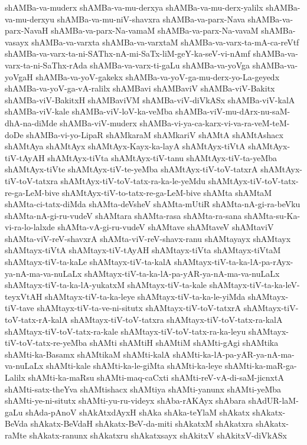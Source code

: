 {shAMBa-va-muderx
shAMBa-va-mu-derxya
shAMBa-va-mu-derx-yalilx
shAMBa-va-mu-derxyu
shAMBa-va-mu-niV-shavxra
shAMBa-va-parx-Nava
shAMBa-va-parx-NavaH
shAMBa-va-parx-Na-vamaM
shAMBa-va-parx-Na-vavaM
shAMBa-vasayx
shAMBa-va-varxta
shAMBa-va-varxtaM
shAMBa-va-varx-ta-mA-ca-reVtf
shAMBa-va-varx-ta-ni-SAThx-nA-mi-SaTx-liM-geY-ka-seV-vi-nAmf
shAMBa-va-varx-ta-ni-SaThx-rAda
shAMBa-va-varx-ti-gaLu
shAMBa-va-yoVga
shAMBa-va-yoVgaH
shAMBa-va-yoV-gakekx
shAMBa-va-yoV-ga-mu-derx-yo-La-geyedx
shAMBa-va-yoV-ga-vA-ralilx
shAMBavi
shAMBaviV
shAMBa-viV-Bakitx
shAMBa-viV-BakitxH
shAMBaviVM
shAMBa-viV-diVkASx
shAMBa-viV-kalA
shAMBa-viV-kale
shAMBa-viV-loV-ka-veMba
shAMBa-viV-mu-dArx-nu-saM-dhA-na-diMde
shAMBa-viV-muderx
shAMBa-vi-ya-ca-karx-vi-va-ra-veM-teM-doDe
shAMBa-vi-yo-LipaR
shAMkaraM
shAMkariV
shAMtA
shAMtAshacx
shAMtAya
shAMtAyx
shAMtAyx-Kayx-ka-layA
shAMtAyx-tiVtA
shAMtAyx-tiV-tAyAH
shAMtAyx-tiVta
shAMtAyx-tiV-tanu
shAMtAyx-tiV-ta-yeMba
shAMtAyx-tiVte
shAMtAyx-tiV-te-yeMba
shAMtAyx-tiV-toV-tatxrA
shAMtAyx-tiV-toV-tatxra
shAMtAyx-tiV-toV-tatx-ra-ka-le-yeMdu
shAMtAyx-tiV-toV-tatx-re-ga-LeM-bive
shAMtAyx-tiV-to-tatx-re-ga-LeM-bive
shAMta
shAMtaM
shAMta-ci-tatx-diMda
shAMta-deVsheV
shAMta-mUtiR
shAMta-nA-gi-ra-beVku
shAMta-nA-gi-ru-vudeV
shAMtara
shAMta-rasa
shAMta-ra-sana
shAMta-su-Ka-vi-ra-lo-lalxde
shAMta-vA-gi-ru-vudeV
shAMtave
shAMtaveV
shAMtaviV
shAMta-viV-reV-shavxrA
shAMta-viV-reV-shavx-ranu
shAMtayayx
shAMtayx
shAMtayx-tiVtA
shAMtayx-tiV-tAyAH
shAMtayx-tiVta
shAMtayx-tiVtaM
shAMtayx-tiV-ta-kaLe
shAMtayx-tiV-ta-kalA
shAMtayx-tiV-ta-ka-lA-pa-rAyx-ya-nA-ma-va-nuLaLx
shAMtayx-tiV-ta-ka-lA-pa-yAR-ya-nA-ma-va-nuLaLx
shAMtayx-tiV-ta-ka-lA-yukatxM
shAMtayx-tiV-ta-kale
shAMtayx-tiV-ta-ka-leV-teyxVtAH
shAMtayx-tiV-ta-ka-leye
shAMtayx-tiV-ta-ka-le-yiMda
shAMtayx-tiV-tave
shAMtayx-tiV-ta-ve-ni-situtx
shAMtayx-tiV-toV-tatxrA
shAMtayx-tiV-toV-tatx-rA-kalA
shAMtayx-tiV-toV-tatxra
shAMtayx-tiV-toV-tatx-ra-kalA
shAMtayx-tiV-toV-tatx-ra-kale
shAMtayx-tiV-toV-tatx-ra-ka-leyu
shAMtayx-tiV-toV-tatx-re-yeMba
shAMti
shAMtiH
shAMtiM
shAMti-gAgi
shAMtika
shAMti-ka-Basamx
shAMtikaM
shAMti-kalA
shAMti-ka-lA-pa-yAR-ya-nA-ma-va-nuLaLx
shAMti-kale
shAMti-ka-le-giMta
shAMti-ka-leye
shAMti-ka-maR-ga-Lalilx
shAMti-ka-maRsu
shAMti-maq-caCxti
shAMti-reV-vA-di-saM-jicnxtA
shAMti-satx-theYva
shAMtishacx
shAMtiya
shAMti-yanunx
shAMti-yeMba
shAMti-ye-ni-situtx
shAMti-yu-ru-videyx
shAba-rAKAyx
shAbara
shAdUR-laM-gaLu
shAda-pAnoV
shAkAtxdAyxH
shAka
shAka-teYlaM
shAkatx
shAkatx-BeVda
shAkatx-BeVdaH
shAkatx-BeV-da-miti
shAkatxM
shAkatxra
shAkatx-raMte
shAkatx-ranunx
shAkatxru
shAkatxsayx
shAkitxV
shAkitxV-diVkASx
}
